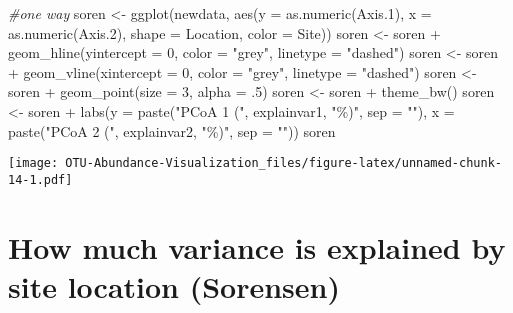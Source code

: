 \documentclass[
]{article}
\newenvironment{Shaded}{\begin{snugshade}}{\end{snugshade}}
\newcommand{\AttributeTok}[1]{\textcolor[rgb]{0.77,0.63,0.00}{#1}}
\newcommand{\CommentTok}[1]{\textcolor[rgb]{0.56,0.35,0.01}{\textit{#1}}}
\newcommand{\DecValTok}[1]{\textcolor[rgb]{0.00,0.00,0.81}{#1}}
\newcommand{\FloatTok}[1]{\textcolor[rgb]{0.00,0.00,0.81}{#1}}
\newcommand{\FunctionTok}[1]{\textcolor[rgb]{0.00,0.00,0.00}{#1}}
\newcommand{\NormalTok}[1]{#1}
\newcommand{\OtherTok}[1]{\textcolor[rgb]{0.56,0.35,0.01}{#1}}
\newcommand{\SpecialCharTok}[1]{\textcolor[rgb]{0.00,0.00,0.00}{#1}}
\newcommand{\StringTok}[1]{\textcolor[rgb]{0.31,0.60,0.02}{#1}}
\begin{document}
\begin{Shaded}
\begin{Highlighting}[]
\CommentTok{\#one way }
\NormalTok{soren }\OtherTok{\textless{}{-}} \FunctionTok{ggplot}\NormalTok{(newdata, }\FunctionTok{aes}\NormalTok{(}\AttributeTok{y =} \FunctionTok{as.numeric}\NormalTok{(Axis}\FloatTok{.1}\NormalTok{), }\AttributeTok{x =} \FunctionTok{as.numeric}\NormalTok{(Axis}\FloatTok{.2}\NormalTok{), }\AttributeTok{shape =}\NormalTok{ Location, }\AttributeTok{color =}\NormalTok{ Site))}
\NormalTok{soren }\OtherTok{\textless{}{-}}\NormalTok{ soren }\SpecialCharTok{+} \FunctionTok{geom\_hline}\NormalTok{(}\AttributeTok{yintercept =} \DecValTok{0}\NormalTok{, }\AttributeTok{color =} \StringTok{"grey"}\NormalTok{, }\AttributeTok{linetype =} \StringTok{"dashed"}\NormalTok{)}
\NormalTok{soren }\OtherTok{\textless{}{-}}\NormalTok{ soren }\SpecialCharTok{+} \FunctionTok{geom\_vline}\NormalTok{(}\AttributeTok{xintercept =} \DecValTok{0}\NormalTok{, }\AttributeTok{color =} \StringTok{"grey"}\NormalTok{, }\AttributeTok{linetype =} \StringTok{"dashed"}\NormalTok{)}
\NormalTok{soren }\OtherTok{\textless{}{-}}\NormalTok{ soren }\SpecialCharTok{+} \FunctionTok{geom\_point}\NormalTok{(}\AttributeTok{size =} \DecValTok{3}\NormalTok{, }\AttributeTok{alpha =}\NormalTok{ .}\DecValTok{5}\NormalTok{)}
\NormalTok{soren }\OtherTok{\textless{}{-}}\NormalTok{ soren }\SpecialCharTok{+} \FunctionTok{theme\_bw}\NormalTok{()}
\NormalTok{soren }\OtherTok{\textless{}{-}}\NormalTok{ soren }\SpecialCharTok{+} \FunctionTok{labs}\NormalTok{(}\AttributeTok{y =} \FunctionTok{paste}\NormalTok{(}\StringTok{"PCoA 1 ("}\NormalTok{, explainvar1, }\StringTok{"\%)"}\NormalTok{, }\AttributeTok{sep =} \StringTok{""}\NormalTok{), }\AttributeTok{x =} \FunctionTok{paste}\NormalTok{(}\StringTok{"PCoA 2 ("}\NormalTok{, explainvar2, }\StringTok{"\%)"}\NormalTok{, }\AttributeTok{sep =} \StringTok{""}\NormalTok{))}
\NormalTok{soren}
\end{Highlighting}
\end{Shaded}

\texttt{[image: OTU-Abundance-Visualization\_files/figure-latex/unnamed-chunk-14-1.pdf]}

\hypertarget{how-much-variance-is-explained-by-site-location-sorensen}{%
\section{How much variance is explained by site location
(Sorensen)}\label{how-much-variance-is-explained-by-site-location-sorensen}}
\end{document}
